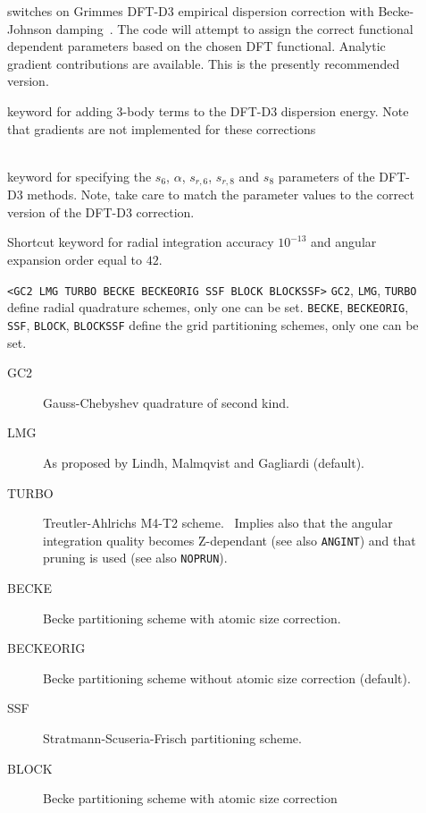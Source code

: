 \begin{description}
\item[] switches on Grimmes DFT-D3 empirical dispersion correction with Becke-Johnson damping~\cite{dft:dftd3bj}.  The code will attempt to assign the correct functional dependent parameters based on the chosen DFT functional.  Analytic gradient contributions are available. This is the presently recommended version.
\item[] keyword for adding 3-body terms to the DFT-D3 dispersion energy. Note that gradients are not implemented for these corrections
\item[]  \\
  keyword for specifying the $s_6$, $\alpha$, $s_{r,6}$, $s_{r,8}$ and $s_8$ parameters of the DFT-D3 methods. Note, take care to match the parameter values to the correct version of the DFT-D3 correction.
\item[]
Shortcut keyword for radial integration accuracy $10^{-13}$ and angular expansion order equal to $42$.
\item[] \verb||\newline
\verb|<GC2 LMG TURBO BECKE BECKEORIG SSF BLOCK BLOCKSSF>|\newline
\verb|GC2|, \verb|LMG|, \verb|TURBO| define radial quadrature schemes, only one can be set.
\verb|BECKE|, \verb|BECKEORIG|, \verb|SSF|, \verb|BLOCK|, \verb|BLOCKSSF| define the grid partitioning schemes, only one can be set. 
\begin{description}
\item[GC2] Gauss-Chebyshev quadrature of second kind. 
\item[LMG] As proposed by Lindh, Malmqvist and Gagliardi (default).~\cite{dft-int:LMG}
\item[TURBO] Treutler-Ahlrichs M4-T2 scheme.~\cite{dft-int:treutler-ahlrichs} Implies also that the angular integration quality becomes Z-dependant (see also \verb|ANGINT|) and that pruning is used (see also \verb|NOPRUN|).
\item[BECKE] Becke partitioning scheme with atomic size correction.~\cite{dft-int:becke}
\item[BECKEORIG] Becke partitioning scheme without atomic size correction (default).~\cite{dft-int:becke}
\item[SSF] Stratmann-Scuseria-Frisch partitioning scheme.~\cite{dft-int:ssf}
\item[BLOCK] Becke partitioning scheme with atomic size correction~\cite{dft-int:becke}

\end{description}
\end{description}
